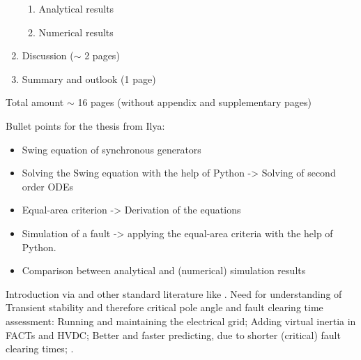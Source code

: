 \begin{enumerate}
\begin{enumerate}
        \item Analytical results
        \item Numerical results
    \end{enumerate}
    \item Discussion ($\sim$ 2 pages)
    \item Summary and outlook (1 page)
\end{enumerate}

Total amount $\sim$ 16 pages (without appendix and supplementary pages)

\newpage
Bullet points for the thesis from Ilya:
\begin{itemize}
    \item Swing equation of synchronous generators
    \item Solving the Swing equation with the help of Python -> Solving of second order ODEs
    \item Equal-area criterion -> Derivation of the equations
    \item Simulation of a fault -> applying the equal-area criteria with the help of Python.
    \item Comparison between analytical and (numerical) simulation results
\end{itemize}


Introduction via \autocite{vdeverbandderelektrotechnikelektronikinformationstechnike.v.PerspektivenElektrischenEnergieubertragung2019} and other standard literature like \autocite{gloverPowerSystemAnalysis2017,kundurPowerSystemStability2022,machowskiPowerSystemDynamics2020,oedingElektrischeKraftwerkeUnd2016,schwabElektroenergiesystemeSmarteStromversorgung2022}. Need for understanding of Transient stability and therefore critical pole angle and fault clearing time assessment: Running and maintaining the electrical grid; Adding virtual inertia in FACTs and HVDC; Better and faster predicting, due to shorter (critical) fault clearing times; .


